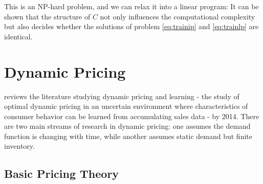 \documentclass[12pt]{report}
\begin{document}
This is an NP-hard problem, and we can relax it into a linear program:
It can be shown that the structure of $C$ not only influences the computational complexity but also decides whether the solutions of problem \ref{eq:trainip} and \ref{eq:trainlp} are identical.

\clearpage
\section{Dynamic Pricing}

\cite{den2015dynamic} reviews the literature studying dynamic pricing and learning - the study of optimal dynamic pricing in an uncertain environment where characteristics of consumer behavior can be learned from accumulating sales data -
by 2014. There are two main streams of research in dynamic pricing: one assumes the demand function is changing with time, while another assumes static demand but finite inventory.

\subsection{Basic Pricing Theory}
\end{document}

